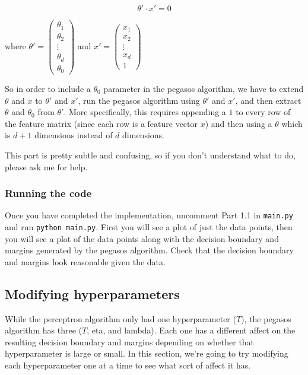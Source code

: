 \documentclass{article}
\begin{document}
$$\theta' \cdot x' = 0$$

\noindent
where
$\theta' = 
\begin{pmatrix}
    \theta_1 \\
    \theta_2 \\
    \vdots \\
    \theta_d \\
    \theta_0
\end{pmatrix}
$
and
$x' = 
\begin{pmatrix}
    x_1 \\
    x_2 \\
    \vdots \\
    x_d \\
    1
\end{pmatrix}
$

So in order to include a $\theta_0$ parameter in the pegasos algorithm, we have to extend $\theta$ and $x$ to $\theta'$ and $x'$, run the pegasos algorithm using $\theta'$ and $x'$, and then extract $\theta$ and $\theta_0$ from $\theta'$. More specifically, this requires appending a $1$ to every row of the feature matrix (since each row is a feature vector $x$) and then using a $\theta$ which is $d+1$ dimensions instead of $d$ dimensions.

This part is pretty subtle and confusing, so if you don't understand what to do, please ask me for help.

\subsubsection{Running the code}

Once you have completed the implementation, uncomment Part 1.1 in \texttt{main.py} and run \texttt{python main.py}. First you will see a plot of just the data points, then you will see a plot of the data points along with the decision boundary and margins generated by the pegasos algorithm. Check that the decision boundary and margins look reasonable given the data.

\subsection{Modifying hyperparameters}

While the perceptron algorithm only had one hyperparameter ($T$), the pegasos algorithm has three ($T$, eta, and lambda). Each one has a different affect on the resulting decision boundary and margins depending on whether that hyperparameter is large or small. In this section, we're going to try modifying each hyperparameter one at a time to see what sort of affect it has.
\end{document}
